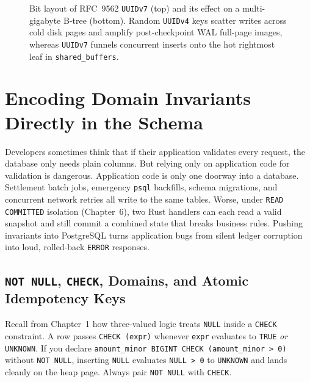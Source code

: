\begin{figure}[H]
\caption{Bit layout of RFC~9562 \texttt{UUIDv7} (top) and its effect on a multi-gigabyte B-tree (bottom). Random \texttt{UUIDv4} keys scatter writes across cold disk pages and amplify post-checkpoint WAL full-page images, whereas \texttt{UUIDv7} funnels concurrent inserts onto the hot rightmost leaf in \texttt{shared\_buffers}.}
\label{ch08:fig-uuidv4-vs-v7}
\end{figure}

\section{Encoding Domain Invariants Directly in the Schema}
\label{ch08:invariants}

Developers sometimes think that if their application validates every request, the database only needs plain columns. But relying only on application code for validation is dangerous. Application code is only one doorway into a database.
Settlement batch jobs, emergency \texttt{psql} backfills, schema migrations, and
concurrent network retries all write to the same tables. Worse, under \texttt{READ
COMMITTED} isolation (Chapter~6), two Rust handlers can each read a valid snapshot
and still commit a combined state that breaks business rules. Pushing invariants
into PostgreSQL turns application bugs from silent ledger corruption into loud,
rolled-back \texttt{ERROR} responses.

\subsection{\texttt{NOT NULL}, \texttt{CHECK}, Domains, and Atomic Idempotency Keys}
\label{ch08:scalar-invariants}

Recall from Chapter~1 how three-valued logic treats \texttt{NULL} inside a
\texttt{CHECK} constraint. A row passes \texttt{CHECK (expr)} whenever
\texttt{expr} evaluates to \texttt{TRUE} \emph{or} \texttt{UNKNOWN}. If you declare
\texttt{amount\_minor BIGINT CHECK (amount\_minor > 0)} without \texttt{NOT NULL},
inserting \texttt{NULL} evaluates \texttt{NULL > 0} to \texttt{UNKNOWN} and lands
cleanly on the heap page. Always pair \texttt{NOT NULL} with \texttt{CHECK}.

